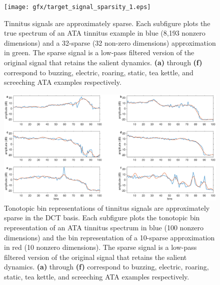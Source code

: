 \documentclass[journal]{IEEEtran}
\begin{document}
\begin{figure}[h]
	\centering
	\texttt{[image: gfx/target\_signal\_sparsity\_1.eps]}
	\caption{Tinnitus signals are approximately sparse.
    Each subfigure plots the true spectrum of an ATA tinnitus example
    in blue (8,193 nonzero dimensions) and a 32-sparse (32 non-zero dimensions)
    approximation in green.
    The sparse signal is a low-pass filtered version of the original signal
    that retains the salient dynamics.
    \textbf{(a)} through \textbf{(f)} correspond to
    buzzing, electric, roaring, static, tea kettle, and screeching ATA examples
    respectively.}
	\label{fig:target_signal_sparsity_1}
\end{figure}

\begin{figure}[h]
	\centering
	\includegraphics[width=\linewidth]{gfx/target_signal_sparsity_2.eps}
	\caption{Tonotopic bin representations of tinnitus signals are approximately sparse
    in the DCT basis.
    Each subfigure plots the tonotopic bin representation of an ATA tinnitus spectrum
    in blue (100 nonzero dimensions) and the bin representation of a 10-sparse
    approximation in red (10 nonzero dimensions).
    The sparse signal is a low-pass filtered version of the original signal
    that retains the salient dynamics.
    \textbf{(a)} through \textbf{(f)} correspond to
    buzzing, electric, roaring, static, tea kettle, and screeching ATA examples
    respectively.}
	\label{fig:target_signal_sparsity_2}
\end{figure}
\end{document}
